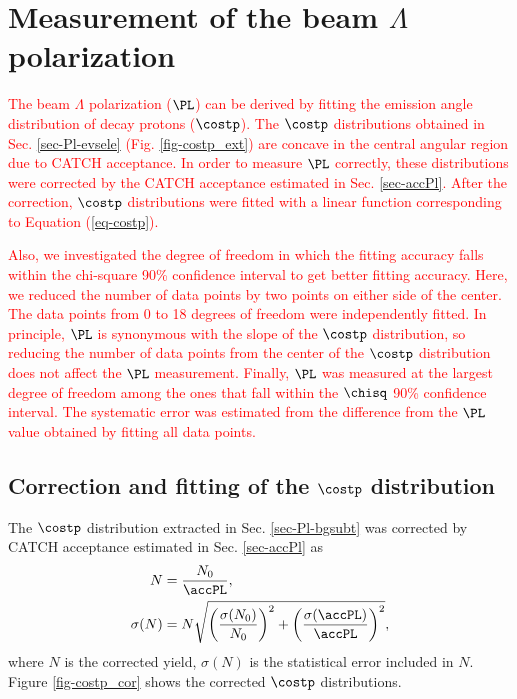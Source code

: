 \section{Measurement of the beam $\Lambda$ polarization}
\label{sec-Plmeas}

\textcolor{red}{ The beam $\Lambda$ polarization ($\PL$) can be derived by fitting the emission angle distribution of decay protons ($\costp$). The $\costp$ distributions obtained in Sec. \ref{sec-Pl-evsele} (Fig. \ref{fig-costp_ext}) are concave in the central angular region due to CATCH acceptance. In order to measure $\PL$ correctly, these distributions were corrected by the CATCH acceptance estimated in Sec. \ref{sec-accPl}. After the correction, $\costp$ distributions were fitted with a linear function corresponding to Equation (\ref{eq-costp}). }

\textcolor{red}{ Also, we investigated the degree of freedom in which the fitting accuracy falls within the chi-square 90\% confidence interval to get better fitting accuracy. Here, we reduced the number of data points by two points on either side of the center. The data points from 0 to 18 degrees of freedom were independently fitted. In principle, $\PL$ is synonymous with the slope of the $\costp$ distribution, so reducing the number of data points from the center of the $\costp$ distribution does not affect the $\PL$ measurement. Finally, $\PL$ was measured at the largest degree of freedom among the ones that fall within the $\chisq$ 90\% confidence interval. The systematic error was estimated from the difference from the $\PL$ value obtained by fitting all data points. }

\subsection{Correction and fitting of the $\costp$ distribution}

The $\costp$ distribution extracted in Sec. \ref{sec-Pl-bgsubt} was corrected by CATCH acceptance estimated in Sec. \ref{sec-accPl} as
\begin{align}
  N &= \frac{N_{0}}{\accPL}, \\
  \sigma(N) &= N \sqrt{\left( \frac{\sigma(N_{0})}{N_{0}} \right)^2 +\left( \frac{\sigma(\accPL)}{\accPL} \right)^2 },  \label{eq-errNcor} \\
\end{align}
where $N$ is the corrected yield, $\sigma(N)$ is the statistical error included in $N$. Figure \ref{fig-costp_cor} shows the corrected $\costp$ distributions.

